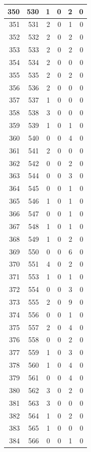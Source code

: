 \documentclass[
  letterpaper,
  DIV=11,
  numbers=noendperiod]{scrreprt}
\begin{document}
\begin{tabular}{r|r|r|r|r|r}
\hline
350 & 530 & 1 & 0 & 2 & 0\\
\hline
351 & 531 & 2 & 0 & 1 & 0\\
\hline
352 & 532 & 2 & 0 & 2 & 0\\
\hline
353 & 533 & 2 & 0 & 2 & 0\\
\hline
354 & 534 & 2 & 0 & 0 & 0\\
\hline
355 & 535 & 2 & 0 & 2 & 0\\
\hline
356 & 536 & 2 & 0 & 0 & 0\\
\hline
357 & 537 & 1 & 0 & 0 & 0\\
\hline
358 & 538 & 3 & 0 & 0 & 0\\
\hline
359 & 539 & 1 & 0 & 1 & 0\\
\hline
360 & 540 & 0 & 0 & 4 & 0\\
\hline
361 & 541 & 2 & 0 & 0 & 0\\
\hline
362 & 542 & 0 & 0 & 2 & 0\\
\hline
363 & 544 & 0 & 0 & 3 & 0\\
\hline
364 & 545 & 0 & 0 & 1 & 0\\
\hline
365 & 546 & 1 & 0 & 1 & 0\\
\hline
366 & 547 & 0 & 0 & 1 & 0\\
\hline
367 & 548 & 1 & 0 & 1 & 0\\
\hline
368 & 549 & 1 & 0 & 2 & 0\\
\hline
369 & 550 & 0 & 0 & 6 & 0\\
\hline
370 & 551 & 4 & 0 & 2 & 0\\
\hline
371 & 553 & 1 & 0 & 1 & 0\\
\hline
372 & 554 & 0 & 0 & 3 & 0\\
\hline
373 & 555 & 2 & 0 & 9 & 0\\
\hline
374 & 556 & 0 & 0 & 1 & 0\\
\hline
375 & 557 & 2 & 0 & 4 & 0\\
\hline
376 & 558 & 0 & 0 & 2 & 0\\
\hline
377 & 559 & 1 & 0 & 3 & 0\\
\hline
378 & 560 & 1 & 0 & 4 & 0\\
\hline
379 & 561 & 0 & 0 & 4 & 0\\
\hline
380 & 562 & 3 & 0 & 2 & 0\\
\hline
381 & 563 & 3 & 0 & 0 & 0\\
\hline
382 & 564 & 1 & 0 & 2 & 0\\
\hline
383 & 565 & 1 & 0 & 0 & 0\\
\hline
384 & 566 & 0 & 0 & 1 & 0\\

\end{tabular}
\end{document}
